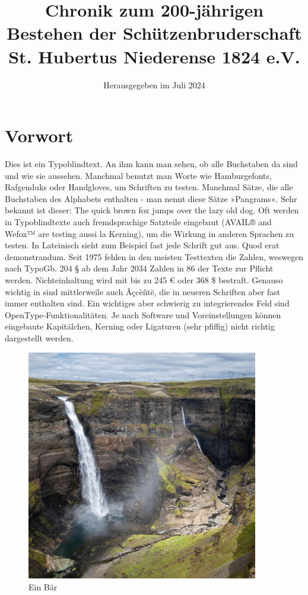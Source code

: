 \documentclass[
a5paper,
10pt, 
onecolumn,
openany,
]{memoir}
\author{}
\title{\sffamily\Huge Chronik zum 200-jährigen Bestehen der Schützenbruderschaft St. Hubertus Niederense 1824 e.V.}
\date{\sffamily Herausgegeben im Juli 2024}
\begin{document}
\raggedbottom

\frontmatter

\maketitle



\cleartooddpage

\tableofcontents*

\cleartooddpage

\chapter{Vorwort}

Dies ist ein Typoblindtext. An ihm kann man sehen, ob alle Buchstaben da sind und wie sie aussehen. Manchmal benutzt man Worte wie Hamburgefonts, Rafgenduks oder Handgloves, um Schriften zu testen. Manchmal Sätze, die alle Buchstaben des Alphabets enthalten - man nennt diese Sätze »Pangrams«. Sehr bekannt ist dieser: The quick brown fox jumps over the lazy old dog. Oft werden in Typoblindtexte auch fremdsprachige Satzteile eingebaut (AVAIL® and Wefox™ are testing aussi la Kerning), um die Wirkung in anderen Sprachen zu testen. In Lateinisch sieht zum Beispiel fast jede Schrift gut aus. Quod erat demonstrandum. Seit 1975 fehlen in den meisten Testtexten die Zahlen, weswegen nach TypoGb. 204 § ab dem Jahr 2034 Zahlen in 86 der Texte zur Pflicht werden. Nichteinhaltung wird mit bis zu 245 € oder 368 \$ bestraft. Genauso wichtig in sind mittlerweile auch Âçcèñtë, die in neueren Schriften aber fast immer enthalten sind. Ein wichtiges aber schwierig zu integrierendes Feld sind OpenType-Funktionalitäten. Je nach Software und Voreinstellungen können eingebaute Kapitälchen, Kerning oder Ligaturen (sehr pfiffig) nicht richtig dargestellt werden.

\begin{figure}
  \centering
  \includegraphics[width=0.9\textwidth]{fotos/a}
  \caption{Ein Bär}
\end{figure}
\end{document}

